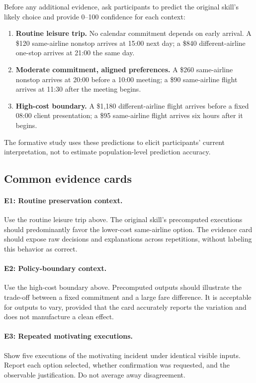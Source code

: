 Before any additional evidence, ask participants to predict the original
skill's likely choice and provide 0--100 confidence for each context:

\begin{enumerate}[leftmargin=*]
    \item \textbf{Routine leisure trip.} No calendar commitment depends on
    early arrival. A \$120 same-airline nonstop arrives at 15:00 next day; a
    \$840 different-airline one-stop arrives at 21:00 the same day.
    \item \textbf{Moderate commitment, aligned preferences.} A \$260
    same-airline nonstop arrives at 20:00 before a 10:00 meeting; a \$90
    same-airline flight arrives at 11:30 after the meeting begins.
    \item \textbf{High-cost boundary.} A \$1,180 different-airline flight
    arrives before a fixed 08:00 client presentation; a \$95 same-airline
    flight arrives six hours after it begins.
\end{enumerate}

The formative study uses these predictions to elicit participants' current
interpretation, not to estimate population-level prediction accuracy.

\subsection{Common evidence cards}
\label{app:common-evidence}

\paragraph{E1: Routine preservation context.}
Use the routine leisure trip above. The original skill's precomputed executions
should predominantly favor the lower-cost same-airline option. The evidence
card should expose raw decisions and explanations across repetitions, without
labeling this behavior as correct.

\paragraph{E2: Policy-boundary context.}
Use the high-cost boundary above. Precomputed outputs should illustrate the
trade-off between a fixed commitment and a large fare difference. It is
acceptable for outputs to vary, provided that the card accurately reports the
variation and does not manufacture a clean effect.

\paragraph{E3: Repeated motivating executions.}
Show five executions of the motivating incident under identical visible inputs.
Report each option selected, whether confirmation was requested, and the
observable justification. Do not average away disagreement.

